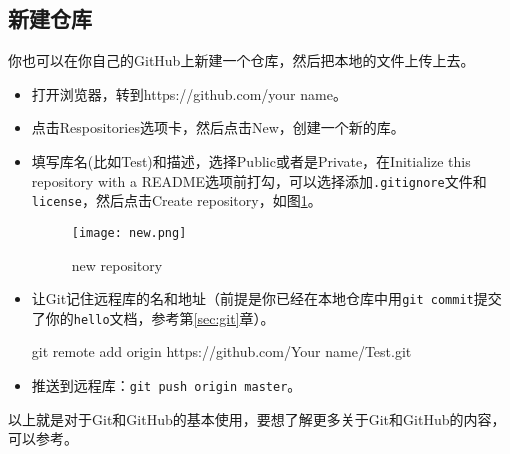 \documentclass[a4paper,12pt]{article}
\begin{document}
\subsection{新建仓库}

你也可以在你自己的GitHub上新建一个仓库，然后把本地的文件上传上去。

\begin{itemize}
\item 打开浏览器，转到https://github.com/your name。
\item 点击Respositories选项卡，然后点击New，创建一个新的库。
\item 填写库名(比如Test)和描述，选择Public或者是Private，在Initialize this repository with a README选项前打勾，可以选择添加\verb|.gitignore|文件和\verb|license|，然后点击Create repository，如图\ref{fig:1}。
\begin{figure}[!htb] %
\centering
\texttt{[image: new.png]}
\caption{new repository}\label{fig:1}
\end{figure}
\item 让Git记住远程库的名和地址（前提是你已经在本地仓库中用\lstinline|git commit|提交了你的\verb|hello|文档，参考第\ref{sec:git}章）。
\begin{bash}
git remote add origin https://github.com/Your name/Test.git
\end{bash}
\item 推送到远程库：\lstinline|git push origin master|。
\end{itemize}

以上就是对于Git和GitHub的基本使用，要想了解更多关于Git和GitHub的内容，可以参考\cite{1:misc}\cite{3:misc}。


\end{document}
